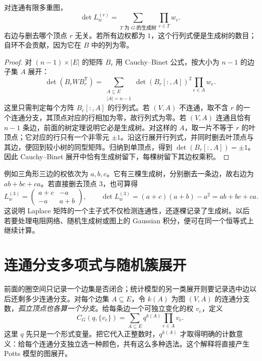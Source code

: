 \begin{theorem}[加权矩阵树定理]
对连通有限多重图，
\begin{equation}
\det L_w^{(r)}
=\sum_{T\text{ 为 }G\text{ 的生成树}}\prod_{e\in T}w_e.
\label{eq:advanced-graph-matrix-tree-primer}
\end{equation}
右边与删去哪个顶点 $r$ 无关。若所有边权都为 $1$，这个行列式便是生成树的数目；自环不会贡献，因为它在 $B$ 中的列为零。
\end{theorem}

\begin{proof}
对 $(n-1)\times |E|$ 的矩阵 $B_r$ 用 Cauchy--Binet 公式，按大小为 $n-1$ 的边子集 $A$ 展开：
\[
\det(B_rWB_r^{\mathsf T})
=\sum_{\substack{A\subseteq E\\|A|=n-1}}
\det(B_r[:,A])^2\prod_{e\in A}w_e.
\]
这里只需判定每个方阵 $B_r[:,A]$ 的行列式。若 $(V,A)$ 不连通，取不含 $r$ 的一个连通分支，其顶点对应的行相加为零，故行列式为零。若 $(V,A)$ 连通且恰有 $n-1$ 条边，前面的树定理说明它必是生成树。对这样的 $A$，取一片不等于 $r$ 的叶顶点；它对应的行只有一个非零元 $\pm1$。沿这行展开行列式，并同时删去叶顶点与其边，便回到较小树的同型矩阵。归纳到单顶点，得到 $\det(B_r[:,A])=\pm1$。因此 Cauchy--Binet 展开中恰有生成树留下，每棵树留下其边权乘积。
\end{proof}

例如三角形三边的权依次为 $a,b,c$。它有三棵生成树，分别删去一条边，故右边为 $ab+bc+ca$。若直接删去顶点 $3$，也可算得
\[
L_w^{(3)}=
\begin{pmatrix}a+c&-a\\-a&a+b\end{pmatrix},
\qquad
\det L_w^{(3)}=(a+c)(a+b)-a^2=ab+bc+ca.
\]
这说明 Laplace 矩阵的一个主子式不仅检测连通性，还逐棵记录了生成树。以后若要处理电阻网络、随机生成树或图上的 Gaussian 积分，便可在同一个恒等式上继续计算。

\section{连通分支多项式与随机簇展开}

前面的圈空间只记录一个边集是否闭合；统计模型的另一类展开则要记录选中边以后还剩多少连通分支。对每个边集 $A\subseteq E$，令 $k(A)$ 为图 $(V,A)$ 的连通分支数，\emph{孤立顶点也各算一个分支}。给每条边一个可独立变化的权 $v_e$，定义
\begin{equation}
 C_G(q,\{v_e\})=\sum_{A\subseteq E}q^{k(A)}\prod_{e\in A}v_e .
 \label{eq:advanced-graph-component-polynomial}
\end{equation}
这里 $q$ 先只是一个形式变量。把它代入正整数时，$q^{k(A)}$ 才取得明确的计数意义：给每个连通分支独立选一种颜色，共有这么多种选法。这个解释将直接产生 Potts 模型的图展开。

